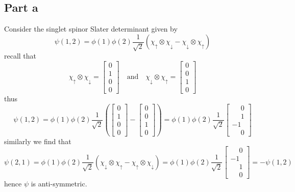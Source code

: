 \documentclass[12pt]{report}
\theoremstyle{custom}
\begin{document}
\subsection*{Part a}
Consider the singlet spinor Slater determinant given by
\begin{equation*}
    \psi(1,2) = \phi(1)\phi(2) \frac{1}{\sqrt{2}} \left(\chi_{\uparrow} \otimes \chi_{\downarrow} - \chi_{\downarrow} \otimes \chi_{\uparrow}\right)
\end{equation*}
recall that
\begin{equation*}
\chi_{\uparrow} \otimes \chi_{\downarrow}  = \begin{bmatrix}
    0 \\ 1 \\ 0 \\ 0
  \end{bmatrix} \quad \text{and} \quad 
\chi_{\downarrow} \otimes \chi_{\uparrow} = \begin{bmatrix}
    0 \\ 0 \\ 1 \\ 0
  \end{bmatrix} 
\end{equation*}
thus
\begin{equation*}
 \psi(1,2) = \phi(1)\phi(2) \frac{1}{\sqrt{2}} \left(\begin{bmatrix}
    0 \\ 1 \\ 0 \\ 0
  \end{bmatrix} -  \begin{bmatrix}
    0 \\ 0 \\ 1 \\ 0
  \end{bmatrix} \right) = \phi(1)\phi(2) \frac{1}{\sqrt{2}} \begin{bmatrix}
    \phantom{-}0 \\ \phantom{-}1 \\ -1 \\ \phantom{-}0
  \end{bmatrix}
\end{equation*}
similarly we find that
\begin{equation*}
\psi(2,1) = \phi(1)\phi(2) \frac{1}{\sqrt{2}}\left(\chi_{\downarrow} \otimes \chi_{\uparrow} - \chi_{\uparrow} \otimes \chi_{\downarrow}\right) = \phi(1)\phi(2) \frac{1}{\sqrt{2}} \begin{bmatrix}
    \phantom{-}0 \\ -1 \\ \phantom{-}1 \\ \phantom{-}0
  \end{bmatrix} = -\psi(1,2)
\end{equation*}
hence $\psi$ is anti-symmetric.
\end{document}
